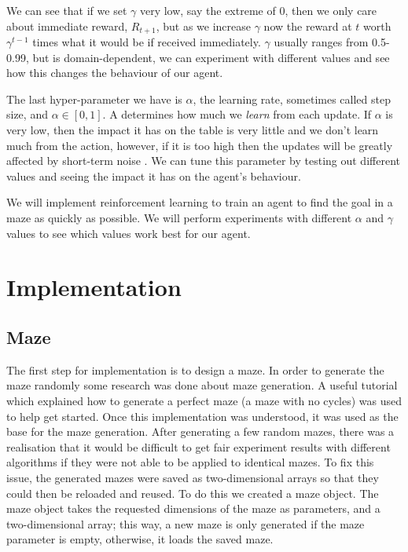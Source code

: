 \documentclass[]{final_report}
\begin{document}
We can see that if we set $\gamma$ very low, say the extreme of 0, then we only care about immediate reward, $R_{t+1}$, but as we increase $\gamma$ now the reward at $t$ worth $\gamma^{t-1}$ times what it would be if received immediately. $\gamma$ usually ranges from 0.5-0.99, but is domain-dependent, we can experiment with different values and see how this changes the behaviour of our agent.

The last hyper-parameter we have is $\alpha$, the learning rate, sometimes called step size, and $\alpha \in [0, 1]$. A determines how much we \textit{learn} from each update. If $\alpha$ is very low, then the impact it has on the table is very little and we don't learn much from the action, however, if it is too high then the updates will be greatly affected by short-term noise \cite{nian2020review}. We can tune this parameter by testing out different values and seeing the impact it has on the agent's behaviour.  

We will implement reinforcement learning to train an agent to find the goal in a maze as quickly as possible. We will perform experiments with different $\alpha$ and $\gamma$ values to see which values work best for our agent.

\chapter{Implementation}\label{chapter: implementation}
\section{Maze}\label{Maze implementation}

The first step for implementation is to design a maze. In order to generate the maze randomly some research was done about maze generation. A useful tutorial\cite{maze} which explained how to generate a perfect maze (a maze with no cycles) was used to help get started. Once this implementation was understood, it was used as the base for the maze generation. After generating a few random mazes, there was a realisation that it would be difficult to get fair experiment results with different algorithms if they were not able to be applied to identical mazes. To fix this issue, the generated mazes were saved as two-dimensional arrays so that they could then be reloaded and reused. To do this we created a maze object. The maze object takes the requested dimensions of the maze as parameters, and a two-dimensional array; this way, a new maze is only generated if the maze parameter is empty, otherwise, it loads the saved maze.
\end{document}
